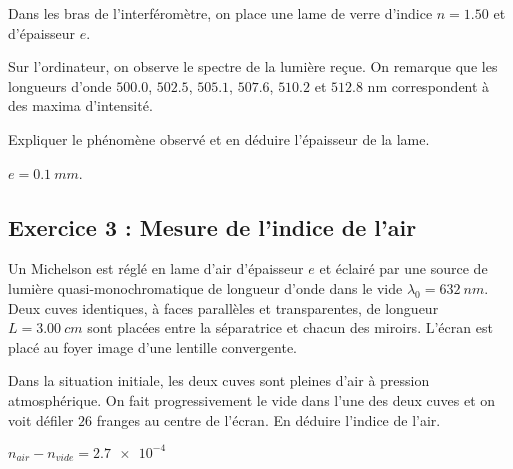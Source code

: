 Dans les bras de l'interféromètre, on place une lame de verre d'indice $n=1.50$ et d'épaisseur $e$.

Sur l'ordinateur, on observe le spectre de la lumière reçue. On remarque que les longueurs d'onde $500.0$, $502.5$, $505.1$, $507.6$, $510.2$ et $512.8$ nm correspondent à des maxima d'intensité.

Expliquer le phénomène observé et en déduire l'épaisseur de la lame.

 $e = \SI{0.1}{mm}$.

\subsection{Exercice 3 : Mesure de l'indice de l'air}

Un Michelson est réglé en lame d'air d'épaisseur $e$ et éclairé par une source de lumière quasi-monochromatique de longueur d'onde dans le vide $\lambda_0 = \SI{632}{nm}$. Deux cuves identiques, à faces parallèles et transparentes, de longueur $L=\SI{3.00}{cm}$ sont placées entre la séparatrice et chacun des miroirs. L'écran est placé au foyer image d'une lentille convergente.

Dans la situation initiale, les deux cuves sont pleines d'air à pression atmosphérique. On fait progressivement le vide dans l'une des deux cuves et on voit défiler $26$ franges au centre de l'écran. En déduire l'indice de l'air.

 $n_{air} - n_{vide} = \SI{2.7e-4}{}$